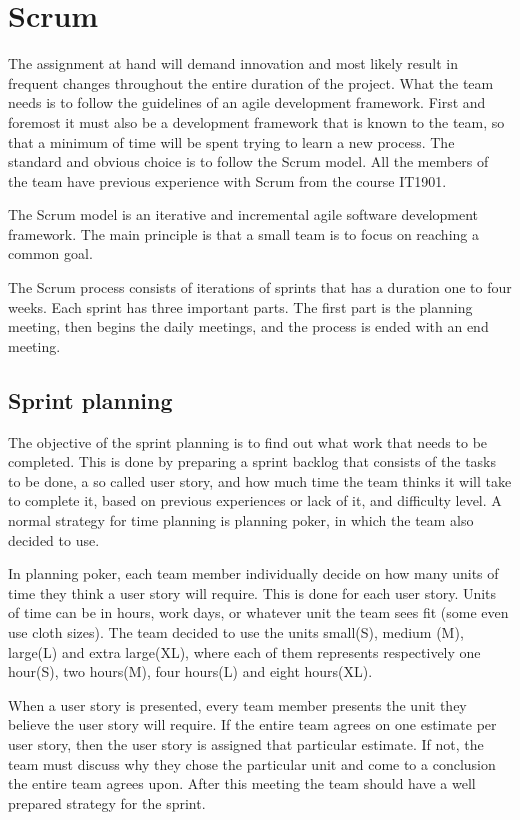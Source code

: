 \section{Scrum}

The assignment at hand will demand innovation and most likely result in frequent changes throughout the entire duration of the project.
What the team needs is to follow the guidelines of an agile development framework. First and foremost it must also be a development framework that is known to the team, so that a minimum of time will be spent trying to learn a new process. The standard and obvious choice is to follow the Scrum model. All the members of the team have previous experience with Scrum from the course IT1901.

The Scrum model is an iterative and incremental agile software development framework. The main principle is that a small team is to focus on reaching a common goal.

The Scrum process consists of iterations of sprints that has a duration one to four weeks. Each sprint has three important parts.
The first part is the planning meeting, then begins the daily  meetings, and the process is ended with an end meeting.

\subsection{Sprint planning}
The objective of the sprint planning is to find out what work that needs to be completed. This is done by preparing a sprint backlog that consists of the tasks to be done, a so called user story, and how much time the team thinks it will take to complete it, based on previous experiences or lack of it, and difficulty level. A normal strategy for time planning is planning poker, in which the team also decided to use.

In planning poker, each team member individually decide on how many units of time they think a user story will require. This is done for each user story. 
Units of time can be in hours, work days, or whatever unit the team sees fit (some even use cloth sizes). The team decided to use the units small(S), medium (M), large(L) and extra large(XL), where each of them represents respectively one hour(S), two hours(M), four hours(L) and eight hours(XL).

When a user story is presented, every team member presents the unit they believe the user story will require. If the entire team agrees on one estimate per user story, then the user story is assigned that particular estimate. If not, the team must discuss why they chose the particular unit and come to a conclusion the entire team agrees upon.
After this meeting the team should have a well prepared strategy for the sprint.

